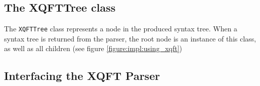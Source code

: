 \subsection{The XQFTTree class}
The \texttt{XQFTTree} class represents a node in the produced syntax tree. When
a syntax tree is returned from the parser, the root node is an instance of this
class, as well as all children (see figure \ref{figure:impl:using_xqft})

\subsection{Interfacing the XQFT Parser}





